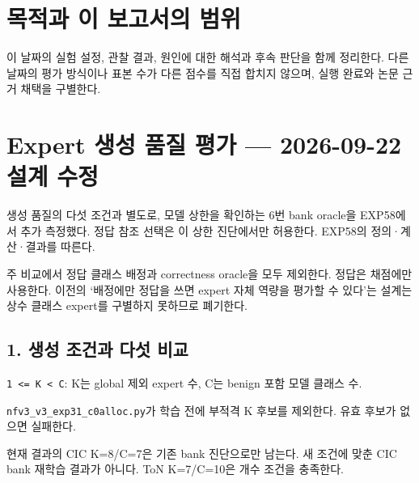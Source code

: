 




\section*{목적과 이 보고서의 범위}

이 날짜의 실험 설정, 관찰 결과, 원인에 대한 해석과 후속 판단을 함께 정리한다. 다른 날짜의 평가 방식이나 표본 수가 다른 점수를 직접 합치지 않으며, 실행 완료와 논문 근거 채택을 구별한다.


\section{Expert 생성 품질 평가 — 2026-09-22 설계 수정}
생성 품질의 다섯 조건과 별도로, 모델 상한을 확인하는 6번 bank oracle을 EXP58에서 추가 측정했다. 정답 참조 선택은 이 상한 진단에서만 허용한다. EXP58의 정의·계산·결과를 따른다.

주 비교에서 정답 클래스 배정과 correctness oracle을 모두 제외한다. 정답은 채점에만 사용한다. 이전의 ‘배정에만 정답을 쓰면 expert 자체 역량을 평가할 수 있다’는 설계는 상수 클래스 expert를 구별하지 못하므로 폐기한다.

\subsection{1. 생성 조건과 다섯 비교}
\par\noindent \textbullet\enspace \texttt{1 <=\allowbreak{}\allowbreak{} K <\allowbreak{} C}: K는 global 제외 expert 수, C는 benign 포함 모델 클래스 수.


\par\noindent \textbullet\enspace \texttt{nfv3\_\allowbreak{}\allowbreak{}v3\_\allowbreak{}\allowbreak{}exp31\_\allowbreak{}\allowbreak{}c0\allowbreak{}alloc.\allowbreak{}py\allowbreak{}}가 학습 전에 부적격 K 후보를 제외한다. 유효 후보가 없으면 실패한다.


\par\noindent \textbullet\enspace 현재 결과의 CIC K=\allowbreak{}8/\allowbreak{}C=\allowbreak{}7은 기존 bank 진단으로만 남는다. 새 조건에 맞춘 CIC bank 재학습 결과가 아니다. ToN K=\allowbreak{}7/\allowbreak{}C=\allowbreak{}10은 개수 조건을 충족한다.


